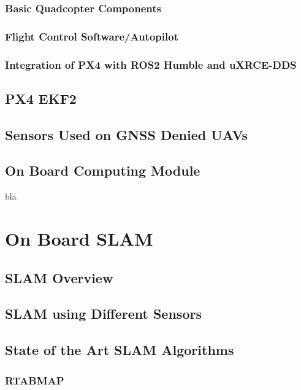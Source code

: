 \subsubsection{Basic Quadcopter Components}

\subsubsection{Flight Control Software/Autopilot}

\subsubsection{Integration of PX4 with ROS2 Humble and uXRCE-DDS}

\subsection{PX4 EKF2}

\subsection{Sensors Used on GNSS Denied UAVs}

\subsection{On Board Computing Module}
bla


\section{On Board SLAM}

\subsection{SLAM Overview}

\subsection{SLAM using Different Sensors}

\subsection{State of the Art SLAM Algorithms}

\subsubsection{RTABMAP}

